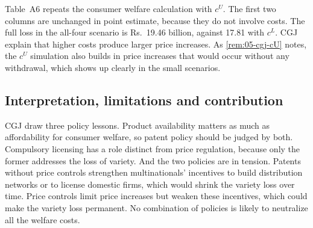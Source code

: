  Table~A6 repeats the consumer welfare calculation with $c^U$. The first two columns
are unchanged in point estimate, because they do not involve costs. The full loss in the all-four scenario is Rs.~19.46
billion, against 17.81 with $c^L$. CGJ explain that higher costs produce larger price increases. As
\cref{rem:05-cgj-cU} notes, the $c^U$ simulation also builds in price increases that would occur without any
withdrawal, which shows up clearly in the small scenarios.

\subsection{Interpretation, limitations and contribution}\label{sec:05-cgj-assessment}

CGJ draw three policy lessons. Product availability matters as much as affordability for consumer welfare, so patent
policy should be judged by both. Compulsory licensing has a role distinct from price regulation, because only the
former addresses the loss of variety. And the two policies are in tension. Patents without price controls strengthen
multinationals' incentives to build distribution networks or to license domestic firms, which would shrink the
variety loss over time. Price controls limit price increases but weaken these incentives, which could make the variety
loss permanent. No combination of policies is likely to neutralize all the welfare costs.

